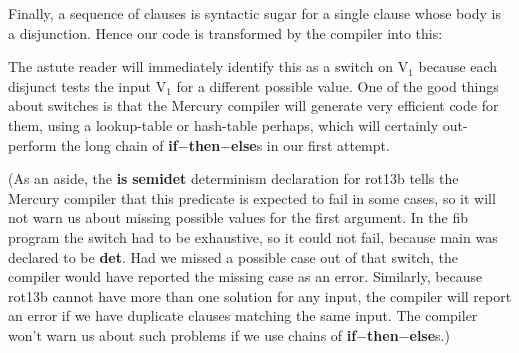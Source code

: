 \documentclass[a4paper,11pt,notitlepage,onecolumn]{book}
\begin{document}
Finally, a sequence of clauses is syntactic sugar for a single clause whose
body is a disjunction.  Hence our code is transformed by the compiler
into this:
\begin{small}

\begin{ptabular}
\nextline
{}
\nextline
{}
\nextline
{}
\nextline
{}
\nextline
{}
\nextline
{}
\nextline
{}
\nextline
\end{ptabular}

\end{small}
The astute reader will immediately identify this as a switch on \textsf{V$_{1}$} because
each disjunct tests the input \textsf{V$_{1}$} for a different possible value.  One of
the good things about switches is that the Mercury compiler will generate
very efficient code for them, using a lookup-table or hash-table perhaps,
which will certainly out-perform the long chain of \textsf{\textbf{if}{\ensuremath{-}}\textbf{then}{\ensuremath{-}}\textbf{else}}s in our
first attempt.

(As an aside, the \textsf{\textbf{is} \textbf{semidet}} determinism declaration for \textsf{rot13b} tells
the Mercury compiler that this predicate is expected to fail in some cases,
so it will not warn us about missing possible values for the first argument.
In the \textsf{fib} program the switch had to be exhaustive, so it could not fail,
because \textsf{main} was declared to be \textsf{\textbf{det}}.  Had we missed a possible case out
of that switch, the compiler would have reported the missing case as an
error.  Similarly, because \textsf{rot13b} cannot have more than one solution for
any input, the compiler will report an error if we have duplicate clauses
matching the same input.  The compiler won't warn us about such problems if
we use chains of \textsf{\textbf{if}{\ensuremath{-}}\textbf{then}{\ensuremath{-}}\textbf{else}}s.)
\end{document}
